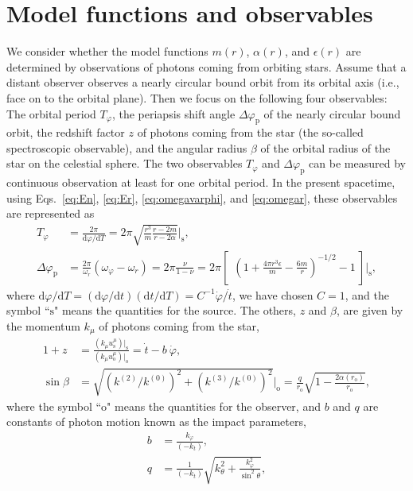 \documentclass[aps,11pt,nofootinbib,preprintnumbers,groupedaddress,superscriptaddress]{revtex4-2}
\begin{document}
\section{Model functions and observables}
\label{sec:5}
We consider whether the model functions $m(r)$, $\alpha(r)$, and $\epsilon(r)$ are determined by observations of photons coming from orbiting stars. Assume
that a distant observer observes a nearly circular 
bound
orbit from its orbital axis (i.e., face on to the orbital plane). 
Then we focus on the following four observables: 
The orbital period $T_\varphi$, 
the periapsis
shift angle $\Delta \varphi_{\mathrm{p}}$ of 
the nearly circular 
bound orbit,
the redshift factor $z$ of photons coming from the 
star (the so-called spectroscopic observable), 
and 
the angular radius $\beta$ of the orbital radius of the 
star
on the celestial sphere. 
The two observables $T_\varphi$ and $\Delta \varphi_{\mathrm{p}}$ can be measured by continuous observation at least for one orbital period. 
In the present spacetime, 
using Eqs.~\eqref{eq:En}, \eqref{eq:Er}, \eqref{eq:omegavarphi}, and \eqref{eq:omegar},
these
observables are represented as
\begin{align}
T_\varphi
&=\frac{2\pi}{\mathrm{d}\varphi/\mathrm{d}T}
=2\pi 
\sqrt{\frac{r^3}{m}\frac{r-2m}{r-2\alpha}}\bigg|_{\mathrm{s}},
\\
\Delta \varphi_{\mathrm{p}}
&=\frac{2\pi}{\omega_r}(\omega_\varphi-\omega_r)
=2\pi \frac{\nu}{1-\nu}=2\pi \left[\:\
\left(1+\frac{4\pi r^3\epsilon}{m}-\frac{6m}{r}\right)^{-1/2}-1
\:\!\right]\!\!\Bigg|_{\mathrm{s}},
\end{align}
where 
$\mathrm{d}\varphi/\mathrm{d}T=(\mathrm{d}\varphi/\mathrm{d}t)(\mathrm{d} t/\mathrm{d}T)=C^{-1} \dot{\varphi}/\dot{t}$, 
we have chosen $C=1$, 
and the symbol ``$\mathrm{s}$" means 
the quantities for the source.
The others, $z$ and $\beta$, are given by the momentum $k_\mu$ of photons coming from the star,
\begin{align}
1+z&=\frac{(k_\mu u_{\mathrm{s}}^\mu)\big|_{\mathrm{s}}}{(k_\mu u_{\mathrm{o}}^\mu)\big|_{\mathrm{o}}}=\dot{t}-b \:\!\dot{\varphi},
\\
\sin \beta&=
\sqrt{(k^{(2)}/k^{(0)})^2+(k^{(3)}/k^{(0)})^2}\Big|_{\mathrm{o}}
=\frac{q}{r_{\mathrm{o}}} \sqrt{1-\frac{2\alpha(r_{\mathrm{o}})}{r_{\mathrm{o}}}},
\end{align}
where the symbol ``$\mathrm{o}$" means 
the quantities for the observer,
and
$b$ and $q$ are constants of photon motion 
known as the impact parameters, 
\begin{align}
\label{eq:bqdef1}
b&=\frac{k_\varphi}{(-k_t)}, 
\\
\label{eq:bqdef2}
q&=\frac{1}{(-k_t)}\sqrt{k_\theta^2+\frac{k_\varphi^2}{\sin^2\theta}},
\end{align}
\end{document}
